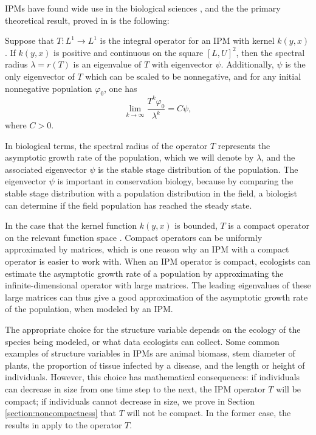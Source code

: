 IPMs have found wide use in the biological sciences \cite{Ellner2016}, and the the primary theoretical result, proved in \cite{Ellner2006} is the following:

\begin{theorem}
	Suppose that $T:L^1 \to L^1$ is the integral operator for an IPM with kernel $k(y, x)$. If $k(y, x)$ is positive and continuous on the square $[L,U]^2$, then the spectral radius $\lambda = r(T)$ is an eigenvalue of $T$ with eigenvector $\psi$. Additionally, $\psi$ is the only eigenvector of $T$ which can be scaled to be nonnegative, and for any initial nonnegative population $\varphi_0$, one has
	\[\lim_{k \to \infty} \frac{T^k\varphi_0}{\lambda^k} = C \psi,\]
	where $C>0$.
\end{theorem}

In biological terms, the spectral radius of the operator $T$ represents the asymptotic growth rate of the population, which we will denote by $\lambda$, and the associated eigenvector $\psi$ is the stable stage distribution of the population. The eigenvector $\psi$ is important in conservation biology, because by comparing the stable stage distribution with a population distribution in the field, a biologist can determine if the field population has reached the steady state. 

In the case that the kernel function $k(y, x)$ is bounded, $T$ is a compact operator on the relevant function space \cite{Ellner2006}. Compact operators can be uniformly approximated by matrices, which is one reason why an IPM with a compact operator is easier to work with. When an IPM operator is compact, ecologists can estimate the asymptotic growth rate of a population by approximating the infinite-dimensional operator with large matrices. The leading eigenvalues of these large matrices can thus give a good approximation of the asymptotic growth rate of the population, when modeled by an IPM.

The appropriate choice for the structure variable depends on the ecology of the species being modeled, or what data ecologists can collect. Some common examples of structure variables in IPMs are animal biomass, stem diameter of plants, the proportion of tissue infected by a disease, and the length or height of individuals. However, this choice has mathematical consequences: if individuals can decrease in size from one time step to the next, the IPM operator $T$ will be compact; if individuals cannot decrease in size, we prove in Section \ref{section:noncompactness} that $T$ will not be compact. In the former case, the results in \cite{Ellner2006} apply to the operator $T$.

